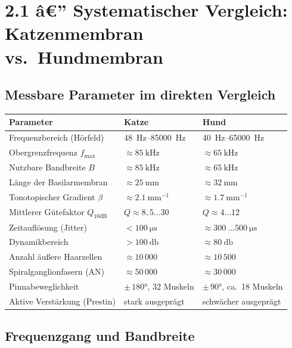 ﻿\documentclass[12pt,a4paper,titlepage]{report}
\begin{document}
\section{2.1 â€” Systematischer Vergleich: Katzenmembran vs.~Hundmembran}

\subsection{Messbare Parameter im direkten Vergleich}

\begin{center}
\renewcommand{\arraystretch}{1.45}
\begin{tabular}{p{5.0cm} p{4.5cm} p{4.5cm}}
\toprule
\textbf{Parameter} & \textbf{Katze} & \textbf{Hund} \\
\midrule
Frequenzbereich (Hörfeld)
  & \SIrange{48}{85000}{\hertz}
  & \SIrange{40}{65000}{\hertz} \\
Obergrenzfrequenz $f_{\max}$
  & $\approx\SI{85}{\kilo\hertz}$
  & $\approx\SI{65}{\kilo\hertz}$ \\
Nutzbare Bandbreite $B$
  & $\approx\SI{85}{\kilo\hertz}$
  & $\approx\SI{65}{\kilo\hertz}$ \\
Länge der Basilarmembran
  & $\approx\SI{25}{\milli\meter}$
  & $\approx\SI{32}{\milli\meter}$ \\
Tonotopischer Gradient $\beta$
  & $\approx\SI{2.1}{\milli\meter^{-1}}$
  & $\approx\SI{1.7}{\milli\meter^{-1}}$ \\
Mittlerer Gütefaktor $Q_{10\text{dB}}$
  & $Q \approx 8{,}5 \ldots 30$
  & $Q \approx 4 \ldots 12$ \\
Zeitauflösung (Jitter)
  & $< \SI{100}{\micro\second}$
  & $\approx \SI{300}{\ldots}\SI{500}{\micro\second}$ \\
Dynamikbereich
  & $>\SI{100}{\decibel}$
  & $\approx\SI{80}{\decibel}$ \\
Anzahl äußere Haarzellen
  & $\approx 10\,000$
  & $\approx 10\,500$ \\
Spiralganglionfasern (AN)
  & $\approx 50\,000$
  & $\approx 30\,000$ \\
Pinnabeweglichkeit
  & $\pm\,180 °$, 32 Muskeln
  & $\pm\,90 °$, ca.~18 Muskeln \\
Aktive Verstärkung (Prestin)
  & stark ausgeprägt
  & schwächer ausgeprägt \\
\bottomrule
\end{tabular}
\end{center}

\subsection{Frequenzgang und Bandbreite}
\end{document}
